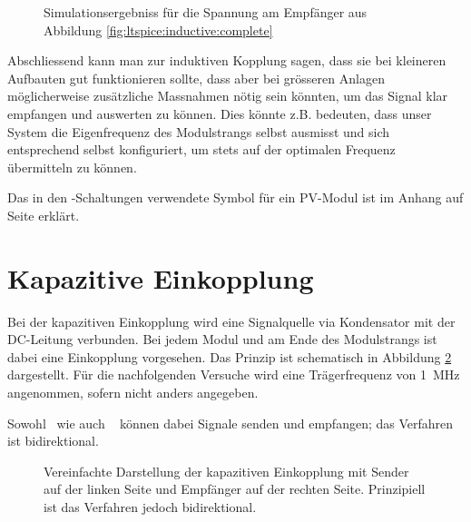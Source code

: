 
\begin{figure}[h!tb]
    
    \caption[Simulationsergebniss induktive Einkopplung bei Resonanz]{%
        Simulationsergebniss f\"ur die Spannung am Empf\"anger aus Abbildung
        \ref{fig:ltspice:inductive:complete}%
    }
    \label{fig:simu:inductive:resonance}
\end{figure}


Abschliessend kann man  zur induktiven Kopplung sagen, dass  sie bei kleineren
Aufbauten  gut  funktionieren  sollte,   dass  aber  bei  gr\"osseren  Anlagen
m\"oglicherweise  zus\"atzliche  Massnahmen  n\"otig sein  k\"onnten,  um  das
Signal klar empfangen und auswerten  zu k\"onnen. Dies k\"onnte z.B. bedeuten,
dass  unser System  die Eigenfrequenz  des Modulstrangs  selbst ausmisst   und
sich entsprechend  selbst konfiguriert,  um stets  auf der  optimalen Frequenz
\"ubermitteln zu k\"onnen.

Das in den -Schaltungen verwendete Symbol f\"ur ein PV-Modul ist
im Anhang auf Seite \pageref{fig:ltspice:module:symbol} erkl\"art.

\clearpage
\section{Kapazitive Einkopplung}
\label{sec:simu:coupling:capacitive}

Bei der  kapazitiven Einkopplung  wird eine  Signalquelle via  Kondensator mit
der  DC-Leitung  verbunden. Bei  jedem  Modul und  am  Ende  des  Modulstrangs
ist   dabei  eine   Einkopplung   vorgesehen. Das   Prinzip  ist   schematisch
in   Abbildung   \ref{fig:circ:coupling:capacitive}   dargestellt. F\"ur   die
nachfolgenden  Versuche  wird  eine Tr\"agerfrequenz  von  \SI{1}{\mega\hertz}
angenommen, sofern nicht anders angegeben.

Sowohl \Master ~wie auch \Sensor~ k\"onnen dabei Signale senden und empfangen;
das Verfahren ist bidirektional.

\begin{figure}[h!tb]
    \centering
    
    \caption[Ersatzschaltbild kapazitive Einkopplung]{%
        Vereinfachte Darstellung  der kapazitiven  Einkopplung mit  Sender auf
        der linken  Seite und  Empf\"anger auf der  rechten Seite. Prinzipiell
        ist das Verfahren jedoch bidirektional.%
    }
    \label{fig:circ:coupling:capacitive}
\end{figure}

